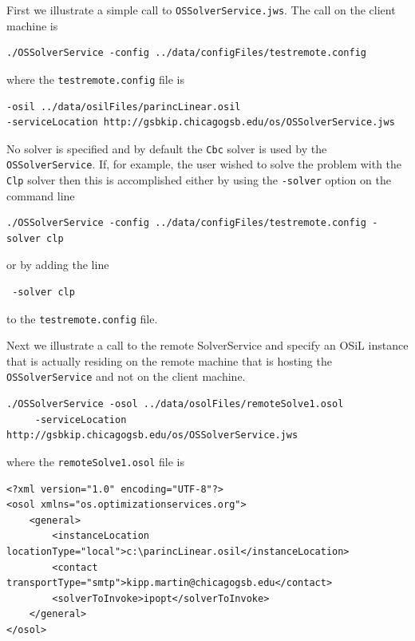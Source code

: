 \documentclass[11pt]{article}
\renewcommand{\_}{{\char"5F}}
\renewcommand{\{}{{\char"7B}}
\renewcommand{\}}{{\char"7D}}
\renewcommand{\^}{{\char"0D}}
\renewcommand{\'}{{\char"0D}}
\begin{document}
\begin{enumerate}[Step 1:]
First we illustrate a simple call to  {\tt OSSolverService.jws}.  The call on the client machine is
\begin{verbatim}
./OSSolverService -config ../data/configFiles/testremote.config
\end{verbatim}
where the {\tt testremote.config} file is
\begin{verbatim}
-osil ../data/osilFiles/parincLinear.osil
-serviceLocation http://gsbkip.chicagogsb.edu/os/OSSolverService.jws
\end{verbatim}

No solver is specified and by default the  {\tt Cbc} solver  is used by the {\tt OSSolverService}.
If, for example, the user wished to solve the problem with the {\tt Clp} solver then this is accomplished
either by using the  {\tt -solver} option on the command line
\begin{verbatim}
./OSSolverService -config ../data/configFiles/testremote.config -solver clp
\end{verbatim}
or by  adding  the line
\begin{verbatim}
 -solver clp
\end{verbatim}
to the  {\tt testremote.config} file.

Next we illustrate a call to the remote SolverService and specify an OSiL instance that is actually residing
on the remote machine that is hosting the {\tt OSSolverService} and not on the client machine.
\begin{verbatim}
./OSSolverService -osol ../data/osolFiles/remoteSolve1.osol
     -serviceLocation  http://gsbkip.chicagogsb.edu/os/OSSolverService.jws
\end{verbatim}
where the {\tt remoteSolve1.osol} file is
\begin{verbatim}
<?xml version="1.0" encoding="UTF-8"?>
<osol xmlns="os.optimizationservices.org">
    <general>
        <instanceLocation locationType="local">c:\parincLinear.osil</instanceLocation>
        <contact transportType="smtp">kipp.martin@chicagogsb.edu</contact>
        <solverToInvoke>ipopt</solverToInvoke>      
    </general>
</osol>
\end{verbatim}


\end{enumerate}
\end{document}
